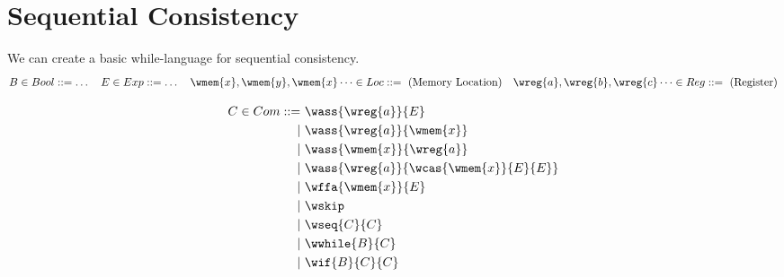 \section{Sequential Consistency}
We can create a basic while-language for sequential consistency.
\[\begin{matrix}
    B \in Bool ::= \dots & E \in Exp::= \dots & \wmem{x}, \wmem{y}, \wmem{x} \dots \in Loc ::= \text{ (Memory Location)} & \wreg{a}, \wreg{b}, \wreg{c} \dots \in Reg ::= \text{ (Register)} \\
\end{matrix}\]

\[\begin{split}
    C \in Com ::= &\  \wass{\wreg{a}}{E} \\
    | & \  \wass{\wreg{a}}{\wmem{x}} \\
    | & \  \wass{\wmem{x}}{\wreg{a}} \\
    | & \  \wass{\wreg{a}}{\wcas{\wmem{x}}{E}{E}}\\
    | & \  \wffa{\wmem{x}}{E} \\
    | & \  \wskip \\
    | & \  \wseq{C}{C} \\
    | & \  \wwhile{B}{C} \\
    | & \  \wif{B}{C}{C} \\
\end{split}\]

